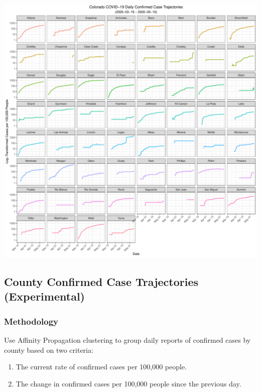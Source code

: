 \documentclass[]{article}
\providecommand{\tightlist}{%
  \setlength{\itemsep}{0pt}\setlength{\parskip}{0pt}}
\begin{document}
\includegraphics{figs/daily-cases-100k-log-1.pdf}

\newpage

\hypertarget{county-confirmed-case-trajectories-experimental}{%
\subsection{County Confirmed Case Trajectories
(Experimental)}\label{county-confirmed-case-trajectories-experimental}}

\hypertarget{methodology}{%
\subsubsection{Methodology}\label{methodology}}

Use Affinity Propagation clustering to group daily reports of confirmed
cases by county based on two criteria:

\begin{enumerate}
\def\labelenumi{\arabic{enumi}.}
\tightlist
\item
  The current rate of confirmed cases per 100,000 people.
\item
  The change in confirmed cases per 100,000 people since the previous
  day.
\end{enumerate}
\end{document}
